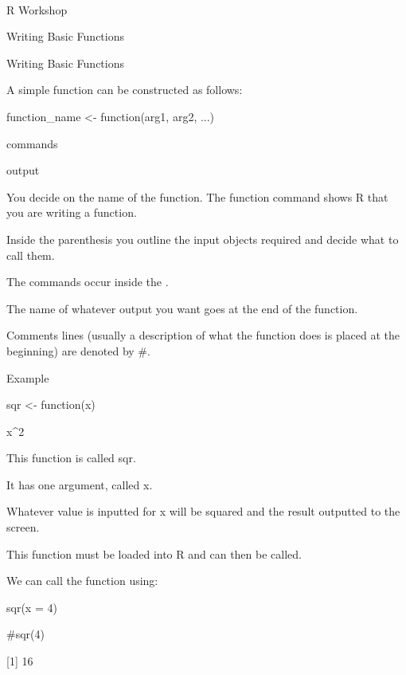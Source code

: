 


R Workshop

Writing Basic Functions

 

Writing Basic Functions

A simple function can be constructed as follows:

 







function_name <- function(arg1, arg2, ...){

commands

output

}

 
 




You decide on the name of the function. The function command shows R that you are writing a function. 

Inside the parenthesis you outline the input objects required and decide what to call them. 

The commands occur inside the { }.

The name of whatever output you want goes at the end of the function. 

Comments lines (usually a description of what the function does is placed at the beginning) are denoted by #.

 Example










sqr <- function(x){


x^2


}
 



This function is called sqr. 

It has one argument, called x.

Whatever value is inputted for x will be squared and the result outputted to the screen. 

This function must be loaded into R and can then be called.

We can call the function using:








sqr(x = 4)


#sqr(4)


[1] 16
 





